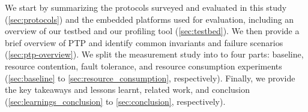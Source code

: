 

%

We start by summarizing the protocols surveyed and evaluated in this study (\cref{sec:protocols})
and the embedded platforms used for evaluation, including an overview of our testbed and our profiling tool \toolName{} (\cref{sec:testbed}).
We then provide a brief overview of PTP and identify common invariants and failure scenarios (\cref{sec:ptp-overview}).
We split the measurement study into to four parts:
baseline, %
resource contention, %
fault tolerance, %
and resource consumption experiments (\cref{sec:baseline} to \cref{sec:resource_consumption}, respectively).
Finally, we provide the key takeaways and lessons learnt,
related work, %
and conclusion
(\cref{sec:learnings_conclusion} to \cref{sec:conclusion}, respectively).
